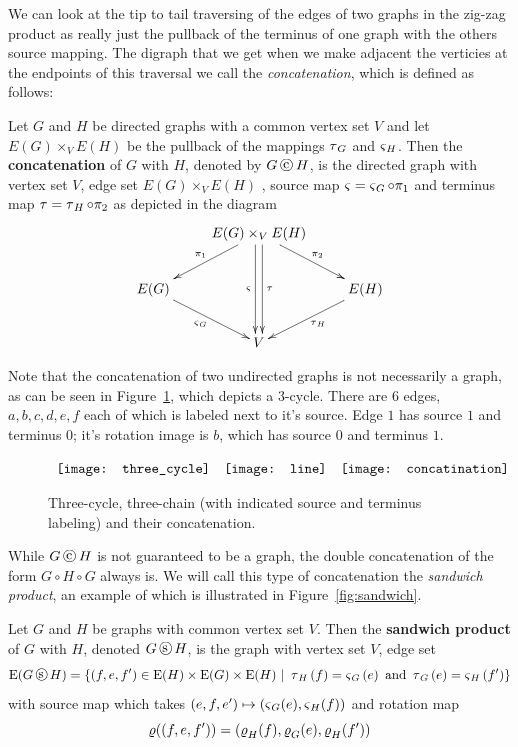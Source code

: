 We can look at the tip to tail traversing of the edges of two graphs in the zig-zag product as really just the pullback of the terminus of one graph with the others source mapping. The digraph that we get when we make adjacent the verticies at the endpoints of this traversal we call the {\em concatenation}, which is defined as follows:
\begin{definition}
Let $G$ and $H$ be directed graphs with a common vertex set $V$ and let $E(G) \times_{V} E(H)$ be the pullback of the mappings $\operatorname{\mathbf{\tau}}_{G}$ and $\operatorname{\mathbf{\varsigma}}_{H}$.  Then the \textbf{concatenation} of $G$ with $H$, denoted by $G \concat H$,  is the directed graph with vertex set $V$,
edge set $E(G) {\times_{V}} E(H)$ , source map $\operatorname{\mathbf{\varsigma}} = \operatorname{\mathbf{\varsigma}}_{G} \circ \pi_{1}$ and terminus map $\operatorname{\mathbf{\tau}} = \operatorname{\mathbf{\tau}}_{H} \circ \pi_2$ as depicted in the diagram 
\[
\xymatrix{
   & E(G) \times_{V} E(H) \ar@<-.25em>[dd]_{\Source} \ar@<+.25em>[dd]^{\Term} \ar[dr]^{\pi_2} \ar[dl]_{\pi_1} &  \\
 E(G) \ar[dr]_{\Source_G}  & &  E(H) \ar[dl]^{\Term_{H}}  \\
   & V & 
}
\]
\end{definition}

Note that the concatenation of two undirected graphs is not necessarily a graph, as can be seen in Figure~\ref{figure:example:concatenation}, which depicts a $3$-cycle. There are $6$ edges, $a,b,c,d,e,f$ each of which is labeled next to it's source. Edge $1$ has source $1$ and terminus $0$; it's rotation image is $b$, which has source $0$ and terminus $1$. 

\begin{figure}[h!]
\centering
\begin{minipage}{.85\textwidth}
$
\begin{array}[h]{ccc}
  \texttt{[image: three\_cycle]} & 
  \texttt{[image: line]} & 
  \texttt{[image: concatination]}
\end{array}
$
\caption{Three-cycle, three-chain (with indicated source and terminus labeling) and their concatenation.\label{figure:example:concatenation}}
\end{minipage}
\end{figure}

While  $G \concat H$ is not guaranteed to be a graph, the double concatenation of the form $G \circ H \circ G$ always is. We will call this type of concatenation  the {\em sandwich product}, an example of which is illustrated in Figure~\ref{fig:sandwich}.

\begin{definition}
Let $G$ and $H$ be graphs with common vertex set $V$. Then the {\bf sandwich product} of $G$ with $H$, denoted $G \sandwich H$, is the graph with vertex set $V$, edge set 
\[
\edgeS{G \sandwich H} = \left\{ ( f,e,f^{\prime} ) \in \edgeS{H} \times \edgeS{G} \times \edgeS{H}  \ \vert \ \Term_{H}\left(f \right) = \Source_{G}\left(e \right)  \ {\rm and} \ \Term_{G}\left(e \right) = \Source_{H}\left(f^{\prime} \right) \right\}
\] with source map which takes $(e,f,e^{\prime}) \mapsto (\operatorname{\mathbf{\varsigma}}_{G}(e) , \operatorname{\mathbf{\varsigma}}_{H}(f))$ and rotation map \[\operatorname{\mathbf{\varrho}}((f,e,f^{\prime})) = \left(\operatorname{\mathbf{\varrho}}_{H}(f) , \operatorname{\mathbf{\varrho}}_{G}(e) ,\operatorname{\mathbf{\varrho}}_{H}(f^{\prime})\right)\]  
\end{definition}


